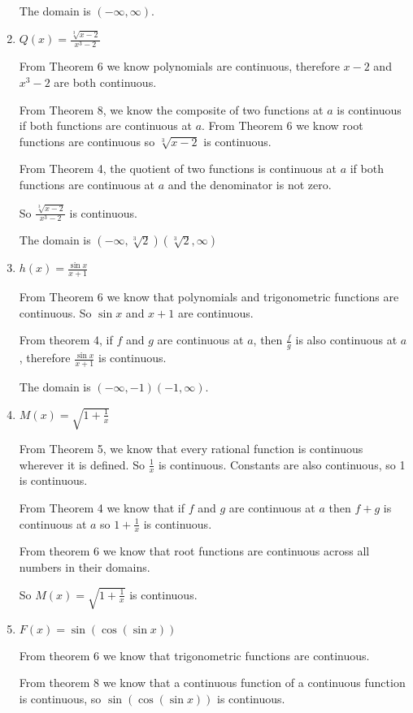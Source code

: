 \documentclass{article}
\begin{document}
\begin{enumerate}
			The domain is $(-\infty, \infty)$.

			\item $Q(x) = \frac{\sqrt[3]{x-2}}{x^3-2}$

			From Theorem 6 we know polynomials are continuous, therefore
			$x-2$ and $x^3-2$ are both continuous.

			From Theorem 8, we know the composite of two functions at $a$
			is continuous if both functions are continuous at $a$. From 
			Theorem 6 we know root functions are continuous so
			$\sqrt[3]{x-2}$ is continuous.

			From Theorem 4, the quotient of two functions is continuous
			at $a$ if both functions are continuous at $a$ and the denominator
			is not zero.

			So $\frac{\sqrt[3]{x-2}}{x^3-2}$ is continuous.

			The domain is $(-\infty, \sqrt[3]{2})(\sqrt[3]{2}, \infty)$

			\item $h(x) = \frac{\sin x}{x+1}$

			From Theorem 6 we know that polynomials and trigonometric
			functions are continuous. So $\sin x$ and $x+1$ are continuous.

			From theorem 4, if $f$ and $g$ are continuous at $a$, then
			$\frac{f}{g}$ is also continuous at $a$, therefore
			$\frac{\sin x}{x+1}$ is continuous.

			The domain is $(-\infty, -1)(-1, \infty)$.

			\item $M(x) = \sqrt{1 + \frac{1}{x}}$

			From Theorem 5, we know that every rational function is continuous
			wherever it is defined. So $\frac{1}{x}$ is continuous. Constants
			are also continuous, so 1 is continuous.

			From Theorem 4 we know that if $f$ and $g$ are continuous at $a$
			then $f + g$ is continuous at $a$ so $1 + \frac{1}{x}$ is continuous.

			From theorem 6 we know that root functions are continuous across all
			numbers in their domains.

			So $M(x) = \sqrt{1 + \frac{1}{x}}$ is continuous.

			\item $F(x) = \sin(\cos(\sin x))$

			From theorem 6 we know that trigonometric functions are continuous.

			From theorem 8 we know that a continuous function of a continuous function
			is continuous, so $\sin(\cos(\sin x))$ is continuous.


\end{enumerate}
\end{document}
